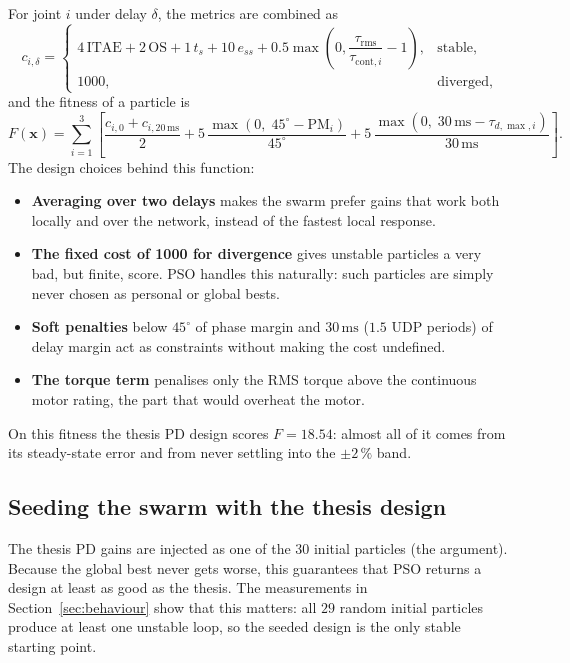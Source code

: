 \documentclass[11pt,a4paper]{article}
\newcommand{\code}[1]{\texttt{\detokenize{#1}}}
\begin{document}
For joint $i$ under delay $\delta$, the metrics are combined as
\begin{equation}
c_{i,\delta} =
\begin{cases}
4\,\mathrm{ITAE} + 2\,\mathrm{OS} + 1\,t_s + 10\,e_{ss} + 0.5\max\!\left(0, \dfrac{\tau_{\mathrm{rms}}}{\tau_{\mathrm{cont},i}} - 1\right), & \text{stable},\\[8pt]
1000, & \text{diverged},
\end{cases}
\end{equation}
and the fitness of a particle is
\begin{equation}
F(\bm x) = \sum_{i=1}^{3}\left[\frac{c_{i,0} + c_{i,20\,\mathrm{ms}}}{2}
+ 5\,\frac{\max(0,\; 45^\circ - \mathrm{PM}_i)}{45^\circ}
+ 5\,\frac{\max(0,\; 30\,\mathrm{ms} - \tau_{d,\max,i})}{30\,\mathrm{ms}}\right].
\label{eq:cost}
\end{equation}
The design choices behind this function:
\begin{itemize}
  \item \textbf{Averaging over two delays} makes the swarm prefer gains that work both locally and over the
        network, instead of the fastest local response.
  \item \textbf{The fixed cost of 1000 for divergence} gives unstable particles a very bad, but finite,
        score. PSO handles this naturally: such particles are simply never chosen as personal or global
        bests.
  \item \textbf{Soft penalties} below $45^\circ$ of phase margin and $30\,\mathrm{ms}$ ($1.5$ UDP periods) of
        delay margin act as constraints without making the cost undefined.
  \item \textbf{The torque term} penalises only the RMS torque above the continuous motor rating, the part
        that would overheat the motor.
\end{itemize}
On this fitness the thesis PD design scores $F = 18.54$: almost all of it comes from its steady-state error
and from never settling into the $\pm2\,\%$ band.

\subsection{Seeding the swarm with the thesis design}

The thesis PD gains are injected as one of the $30$ initial particles (the \code{x0} argument). Because
the global best never gets worse, this guarantees that PSO returns a design at least as good as the
thesis. The measurements in Section~\ref{sec:behaviour} show that this matters: all $29$ random initial
particles produce at least one unstable loop, so the seeded design is the only stable starting point.
\end{document}
